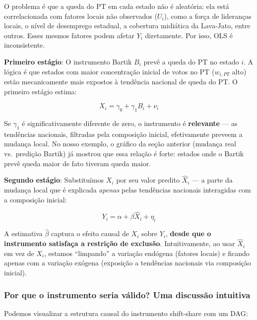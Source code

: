 \documentclass[
]{article}
\begin{document}
O problema é que a queda do PT em cada estado não é aleatória: ela está correlacionada com fatores locais não observados (\(U_i\)), como a força de lideranças locais, o nível de desemprego estadual, a cobertura midiática da Lava-Jato, entre outros. Esses mesmos fatores podem afetar \(Y_i\) diretamente. Por isso, OLS é inconsistente.

\textbf{Primeiro estágio}: O instrumento Bartik \(B_i\) prevê a queda do PT no estado \(i\). A lógica é que estados com maior concentração inicial de votos no PT (\(w_{i,PT}\) alto) estão mecanicamente mais expostos à tendência nacional de queda do PT. O primeiro estágio estima:

\[X_i = \gamma_0 + \gamma_1 B_i + \nu_i\]

Se \(\gamma_1\) é significativamente diferente de zero, o instrumento é \textbf{relevante} --- as tendências nacionais, filtradas pela composição inicial, efetivamente preveem a mudança local. No nosso exemplo, o gráfico da seção anterior (mudança real vs.~predição Bartik) já mostrou que essa relação é forte: estados onde o Bartik prevê queda maior de fato tiveram queda maior.

\textbf{Segundo estágio}: Substituímos \(X_i\) por seu valor predito \(\hat{X}_i\) --- a parte da mudança local que é explicada \emph{apenas} pelas tendências nacionais interagidas com a composição inicial:

\[Y_i = \alpha + \beta \hat{X}_i + \eta_i\]

A estimativa \(\hat{\beta}\) captura o efeito causal de \(X_i\) sobre \(Y_i\), \textbf{desde que o instrumento satisfaça a restrição de exclusão}. Intuitivamente, ao usar \(\hat{X}_i\) em vez de \(X_i\), estamos ``limpando'' a variação endógena (fatores locais) e ficando apenas com a variação exógena (exposição a tendências nacionais via composição inicial).

\subsubsection{Por que o instrumento seria válido? Uma discussão intuitiva}\label{por-que-o-instrumento-seria-vuxe1lido-uma-discussuxe3o-intuitiva}

Podemos visualizar a estrutura causal do instrumento shift-share com um DAG:
\end{document}
